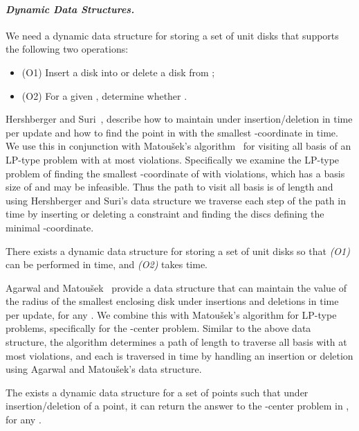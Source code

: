 \documentclass[11pt]{myclass}
\begin{document}
\paragraph{\textbf{\emph{Dynamic Data Structures.}}} 
We need a dynamic data structure for storing a set  of unit disks that supports the following two operations:
\begin{itemize}
\item{(O1)} Insert a disk into  or delete a disk from ;
\item{(O2)} For a given , determine whether .
\end{itemize}

Hershberger and Suri~\cite{HS91}, describe how to maintain  under insertion/deletion in  time per update and how to find the point in  with the smallest -coordinate in  time.
We use this in conjunction with Matou\v{s}ek's algorithm~\cite{Mat95} for visiting all basis of an LP-type problem with at most  violations.   Specifically we examine the LP-type problem of finding the smallest -coordinate of  with  violations, which has a basis size of  and may be infeasible.  Thus the path to visit all basis is of length  and using Hershberger and Suri's data structure we traverse each step of the path in  time by inserting or deleting a constraint and finding the discs defining the minimal -coordinate.  

\begin{lemma}
There exists a dynamic data structure for storing a set of  unit disks so that \emph{(O1)} can be performed in  time, and \emph{(O2)} takes  time.  
\label{lem:dynD}
\end{lemma}


Agarwal and Matou\v{s}ek~\cite{AM95} provide a data structure that can maintain the value of the radius of the smallest enclosing disk under insertions and deletions in  time per update, for any .  
We combine this with Matou\v{s}ek's algorithm for LP-type problems, specifically for the -center problem.  Similar to the above data structure, the algorithm determines a path of length  to traverse all basis with at most  violations, and each is traversed in  time by handling an insertion or deletion using Agarwal and Matou\v{s}ek's data structure.  

\begin{lemma}
The exists a dynamic data structure for a set of  points such that under insertion/deletion of a point, it can return the answer to the -center problem in , for any .  
\label{lem:dynC}
\end{lemma}
\end{document}
